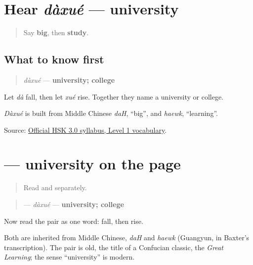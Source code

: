\section[dàxué]{Hear \emph{dàxué} — university}

\label{lesson:ZH-C13-hear-daxue}



\begin{quote}
Say \textbf{big}, then \textbf{study}.
\end{quote}

\subsection*{What to know first}
\begin{quote}
\emph{dàxué} — \textbf{university; college}
\end{quote}

Let \emph{dà} fall, then let \emph{xué} rise. Together they name a university or college.

\emph{Dàxué} is built from Middle Chinese \emph{daH}, \textquotedblleft{}big\textquotedblright{}, and \emph{haewk}, \textquotedblleft{}learning\textquotedblright{}.

\begin{tcolorbox}[breakable,colback=teal!4,colframe=teal!35!black,title={Before you move on}]
Source: \href{https://hsk.cn-bj.ufileos.com/3.0/\%E6\%96\%B0\%E7\%89\%88HSK\%E8\%80\%83\%E8\%AF\%95\%E5\%A4\%A7\%E7\%BA\%B21219.pdf}{Official HSK 3.0 syllabus, Level 1 vocabulary}.
\end{tcolorbox}
\section[\texorpdfstring{\zh{大学} (dàxué)}{大学 (dàxué)}]{ — university on the page}

\label{lesson:ZH-C13-daxue}



\begin{quote}
Read  and  separately.
\end{quote}

\begin{cousinweb}
\begin{quote}
\textbf{} — \emph{dàxué} — \textbf{university; college}
\end{quote}

Now read the pair as one word: fall, then rise.

Both are inherited from Middle Chinese, \emph{daH} and \emph{haewk} (Guangyun, in Baxter's transcription). The pair is old, the title of a Confucian classic, the \emph{Great Learning}; the sense \textquotedblleft{}university\textquotedblright{} is modern.
\end{cousinweb}


